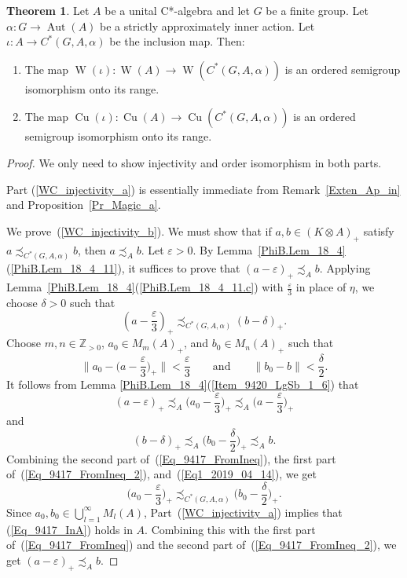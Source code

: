 \documentclass[10pt]{amsart}
\numberwithin{equation}{section}
\theoremstyle{definition}
\newtheorem{thm}{Theorem}[section]
\newcommand{\af}{\alpha}
\newcommand{\dt}{\delta}
\newcommand{\ep}{\varepsilon}
\newcommand{\N}{{\mathbb{Z}}_{> 0}}
\newcommand{\Cu}{{\operatorname{Cu}}}
\newcommand{\Aut}{{\operatorname{Aut}}}
\newcommand{\W}{{\operatorname{W}}}
\newcommand{\andeqn}{\qquad {\mbox{and}} \qquad}
\newcommand{\ca}{C*-algebra}
\newcommand{\CGAa}{C^* (G, A, \af)}
\newcommand{\I}{\infty}
\begin{document}
%
\begin{thm}\label{WC_injectivity}
Let $A$ be a unital \ca{} and let $G$ be a finite group. Let $\alpha \colon G \to \Aut(A)$
be a strictly  approximately inner action.
Let $\iota \colon A \to \CGAa$ be the inclusion map.
Then:
\begin{enumerate}
\item\label{WC_injectivity_a}
The map $\W (\iota) \colon \W (A) \to \W (\CGAa)$
is an ordered semigroup isomorphism onto its range.
\item\label{WC_injectivity_b}
The map $\Cu (\iota) \colon \Cu (A) \to \Cu (\CGAa)$
is an ordered semigroup isomorphism onto its range.
\end{enumerate}
\end{thm}

\begin{proof}
We only need to show injectivity and order isomorphism in both parts.

Part (\ref{WC_injectivity_a}) is essentially immediate from Remark~\ref{Exten_Ap_in} and Proposition~\ref{Pr_Magic_a}.

We prove~(\ref{WC_injectivity_b}).
We must show that if $a, b \in ( K \otimes A)_{+}$
satisfy $a \precsim_{\CGAa} b$,
then $a \precsim_{A} b$.
Let $\ep > 0$.
By Lemma~\ref{PhiB.Lem_18_4}(\ref{PhiB.Lem_18_4_11}), it suffices to prove that
$(a - \ep)_{+} \precsim_{A} b$.
Applying Lemma~\ref{PhiB.Lem_18_4}(\ref{PhiB.Lem_18_4_11.c}) with $\frac{\ep}{3}$ in place of $\eta$, we choose $\dt > 0$ such that
\begin{equation}\label{Eq1_2019_04_14}
\left( a - \frac{\ep}{3} \right)_{+} \precsim_{\CGAa} (b - \dt)_{+}.
\end{equation}
Choose $m, n \in \N$,
$a_0 \in M_m (A)_+$, and $b_0 \in M_n (A)_+$
such that
\[
\bigg\| a_0 - \Big( a - \frac{\ep}{3} \Big)_{+} \bigg\|
   < \frac{\ep}{3}
\andeqn
\| b_0 - b \|
   < \frac{\dt}{2}.
\]
It follows from Lemma \ref{PhiB.Lem_18_4}(\ref{Item_9420_LgSb_1_6})
that
%
\begin{equation}\label{Eq_9417_FromIneq}
(a - \ep)_{+}
 \precsim_{A} \Big( a_0 - \frac{\ep}{3} \Big)_{+}
 \precsim_{A} \Big( a - \frac{\ep}{3} \Big)_{+}
\end{equation}
%
and
%
\begin{equation}\label{Eq_9417_FromIneq_2}
(b - \dt)_{+}
 \precsim_{A} \Big( b_0 - \frac{\dt}{2} \Big)_{+}
 \precsim_{A} b.
\end{equation}
%
Combining the second part of~(\ref{Eq_9417_FromIneq}),
the first part of~(\ref{Eq_9417_FromIneq_2}),
and~(\ref{Eq1_2019_04_14}),
we get
%
\begin{equation}\label{Eq_9417_InA}
\Big( a_0 - \frac{\ep}{3} \Big)_{+}
  \precsim_{\CGAa} \Big( b_0 - \frac{\dt}{2} \Big)_{+}.
\end{equation}
%
Since
$a_0, b_0 \in \bigcup_{l = 1}^{\I} M_l (A)$,
Part~(\ref{WC_injectivity_a})
implies that (\ref{Eq_9417_InA})
holds in $A$.
Combining this with
the first part of~(\ref{Eq_9417_FromIneq})
and the second part of~(\ref{Eq_9417_FromIneq_2}),
we get $(a - \ep)_{+} \precsim_{A} b$.
\end{proof}
\end{document}
